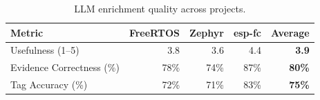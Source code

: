 \begin{table}[t]
\centering
\caption{LLM enrichment quality across projects.}
\label{tab:llm_quality}
\begin{tabular}{lrrrr}
\toprule
Metric & FreeRTOS & Zephyr & esp-fc & Average \\
\midrule
Usefulness (1–5) & 3.8 & 3.6 & 4.4 & \textbf{3.9} \\
Evidence Correctness (\%) & 78\% & 74\% & 87\% & \textbf{80\%} \\
Tag Accuracy (\%) & 72\% & 71\% & 83\% & \textbf{75\%} \\
\bottomrule
\end{tabular}
\end{table}